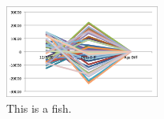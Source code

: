 \documentclass{proc}
\begin{document}
\begin{figure}[htbp]
\begin{center}
\includegraphics[width=2in]{fish.png}
\caption{This is a fish.}
\label{fig:fish}
\end{center}
\end{figure}


\section{}

\section{}
\end{document}
